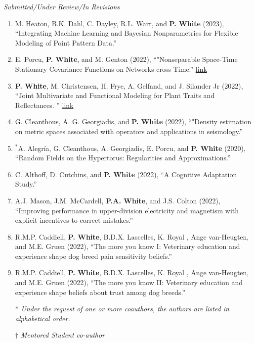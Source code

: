 \documentclass[11pt]{article}
\begin{document}
\emph{Submitted/Under Review/In Revisions}

\begin{enumerate}[label=$\bullet$]


\item M. Heaton, B.K. Dahl, C. Dayley, R.L. Warr, and \textbf{P. White} (2023), ``Integrating Machine Learning and Bayesian Nonparametrics for Flexible Modeling of Point Pattern Data.''


\item E. Porcu, \textbf{P. White}, and M. Genton (2022), ``"Nonseparable Space-Time Stationary Covariance Functions on Networks cross Time.'' \href{https://arxiv.org/abs/2208.03359}{link}

\item \textbf{P. White}, M. Christensen, H. Frye, A. Gelfand, and J. Silander Jr (2022), ``Joint Multivariate and Functional Modeling for Plant Traits and Reflectances.
''  \href{https://arxiv.org/abs/2210.00409}{link}

\item G. Cleanthous, A. G. Georgiadis, and \textbf{P. White} (2022), ``"Density estimation on metric spaces associated with operators and applications in seismology.''


\item $^*$A. Alegr\'ia, G. Cleanthous, A. Georgiadis, E. Porcu, and \textbf{P. White} (2020), ``Random Fields on the Hypertorus: Regularities and Approximations.'' 

\item C. Althoff, D. Cutchins, and \textbf{P. White} (2022), ``A Cognitive Adaptation Study.'' 

\item A.J. Mason, J.M. McCardell, \textbf{P.A. White}, and J.S. Colton (2022), ``Improving performance in upper-division electricity and magnetism with explicit incentives to correct mistakes.'' 

\item  R.M.P. Caddiell, \textbf{P. White}, B.D.X. Lascelles, K. Royal , Ange van-Heugten, and M.E. Gruen (2022), ``The more you know I: Veterinary education and experience shape dog breed pain sensitivity beliefs.''

\item  R.M.P. Caddiell, \textbf{P. White}, B.D.X. Lascelles, K. Royal , Ange van-Heugten, and M.E. Gruen (2022), ``The more you know II: Veterinary education and experience shape beliefs about trust among dog breeds.''
\setlength\itemsep{-1em} \\
\item[$*$] \textit{Under the request of one or more coauthors, the authors are listed in alphabetical order.}\\
\item[$\dagger$] \textit{Mentored Student co-author}
\end{enumerate}
\end{document}
